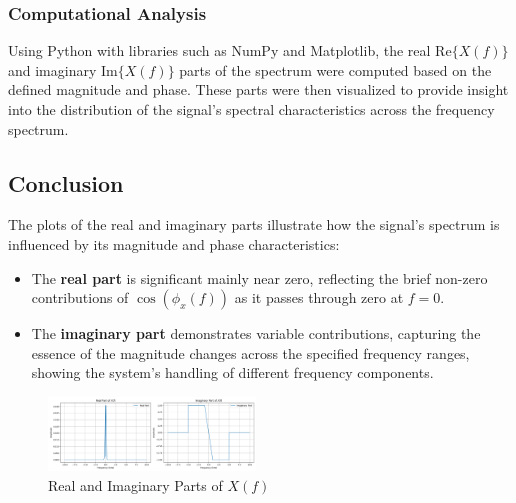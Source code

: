 \subsubsection{Computational Analysis}
Using Python with libraries such as NumPy and Matplotlib, the real $\text{Re}\{X(f)\}$ and imaginary $\text{Im}\{X(f)\}$ parts of the spectrum were computed based on the defined magnitude and phase. These parts were then visualized to provide insight into the distribution of the signal's spectral characteristics across the frequency spectrum.

\subsection{Conclusion}
The plots of the real and imaginary parts illustrate how the signal's spectrum is influenced by its magnitude and phase characteristics:
\begin{itemize}
    \item The \textbf{real part} is significant mainly near zero, reflecting the brief non-zero contributions of $\cos(\phi_x(f))$ as it passes through zero at $f = 0$.
    \item The \textbf{imaginary part} demonstrates variable contributions, capturing the essence of the magnitude changes across the specified frequency ranges, showing the system's handling of different frequency components.
\end{itemize}

\begin{figure}[h]
    \centering
    \includegraphics[width=0.49\textwidth]{fig/ex2_a_plot}
    \caption{Real and Imaginary Parts of $X(f)$}
    \label{fig:ex2_a_plot}
\end{figure}
